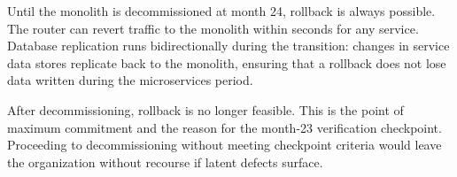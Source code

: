 Until the monolith is decommissioned at month 24, rollback is always possible. The router can revert traffic to the monolith within seconds for any service. Database replication runs bidirectionally during the transition: changes in service data stores replicate back to the monolith, ensuring that a rollback does not lose data written during the microservices period.

After decommissioning, rollback is no longer feasible. This is the point of maximum commitment and the reason for the month-23 verification checkpoint. Proceeding to decommissioning without meeting checkpoint criteria would leave the organization without recourse if latent defects surface.
